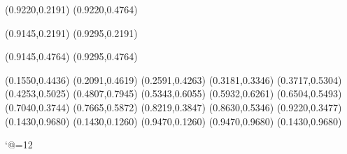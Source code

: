 \PST@Solid(0.9220,0.2191)
(0.9220,0.4764)

\PST@Solid(0.9145,0.2191)
(0.9295,0.2191)

\PST@Solid(0.9145,0.4764)
(0.9295,0.4764)

\PST@Diamond(0.1550,0.4436)
\PST@Diamond(0.2091,0.4619)
\PST@Diamond(0.2591,0.4263)
\PST@Diamond(0.3181,0.3346)
\PST@Diamond(0.3717,0.5304)
\PST@Diamond(0.4253,0.5025)
\PST@Diamond(0.4807,0.7945)
\PST@Diamond(0.5343,0.6055)
\PST@Diamond(0.5932,0.6261)
\PST@Diamond(0.6504,0.5493)
\PST@Diamond(0.7040,0.3744)
\PST@Diamond(0.7665,0.5872)
\PST@Diamond(0.8219,0.3847)
\PST@Diamond(0.8630,0.5346)
\PST@Diamond(0.9220,0.3477)
\PST@Border(0.1430,0.9680)
(0.1430,0.1260)
(0.9470,0.1260)
(0.9470,0.9680)
(0.1430,0.9680)

\catcode`@=12
\fi
\endpspicture
